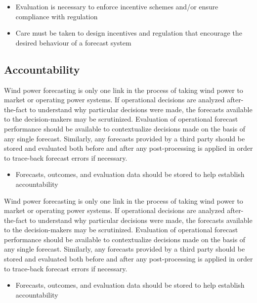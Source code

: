 \begin{itemize}
    \item Evaluation is necessary to enforce incentive schemes and/or ensure compliance with regulation
    \item Care must be taken to design incentives and regulation that encourage the desired behaviour of a forecast system
\end{itemize}

\subsection{Accountability}

Wind power forecasting is only one link in the process of taking wind power to market or operating power systems. If operational decisions are analyzed after-the-fact to understand why particular decisions were made, the forecasts available to the decision-makers may be scrutinized. Evaluation of operational forecast performance should be available to contextualize decisions made on the basis of any single forecast. Similarly, any forecasts provided by a third party should be stored and evaluated both before and after any post-processing is applied in order to trace-back forecast errors if necessary.

\begin{itemize}
    \item Forecasts, outcomes, and evaluation data should be stored to help establish accountability
\end{itemize}

Wind power forecasting is only one link in the process of taking wind power to market or operating power systems. If operational decisions are analyzed after-the-fact to understand why particular decisions were made, the forecasts available to the decision-makers may be scrutinized. Evaluation of operational forecast performance should be available to contextualize decisions made on the basis of any single forecast. Similarly, any forecasts provided by a third party should be stored and evaluated both before and after any post-processing is applied in order to trace-back forecast errors if necessary.

\begin{itemize}
    \item Forecasts, outcomes, and evaluation data should be stored to help establish accountability
\end{itemize}



